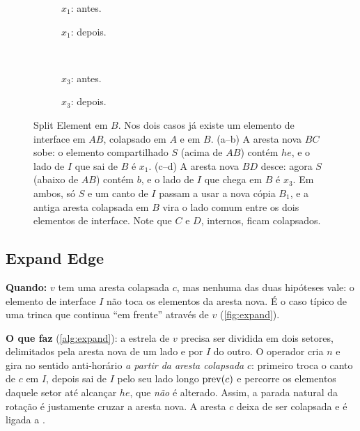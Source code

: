\begin{figure}[ht]
\centering
\begin{subfigure}[b]{0.31\linewidth}\centering\caption{$x_1$: antes.}\end{subfigure}\hspace{0.06\linewidth}
\begin{subfigure}[b]{0.31\linewidth}\centering\caption{$x_1$: depois.}\end{subfigure}\\[6pt]
\begin{subfigure}[b]{0.31\linewidth}\centering\caption{$x_3$: antes.}\end{subfigure}\hspace{0.06\linewidth}
\begin{subfigure}[b]{0.31\linewidth}\centering\caption{$x_3$: depois.}\end{subfigure}
\caption{Split Element em $B$. Nos dois casos já existe um elemento de interface em $AB$, colapsado em $A$ e em $B$.
(a--b) A aresta nova $BC$ sobe: o elemento compartilhado $S$ (acima de $AB$) contém $he$, e o lado de $I$ que sai de $B$
é $x_1$. (c--d) A aresta nova $BD$ desce: agora $S$ (abaixo de $AB$) contém $b$, e o lado de $I$ que chega em $B$ é
$x_3$. Em ambos, só $S$ e um canto de $I$ passam a usar a nova cópia $B_1$, e a antiga aresta colapsada em $B$ vira o
lado comum entre os dois elementos de interface. Note que $C$ e $D$, internos, ficam colapsados.}
\label{fig:split}
\end{figure}

\subsection{Expand Edge}
\label{sec:expand}

\textbf{Quando:} $v$ tem uma aresta colapsada $c$, mas nenhuma das duas hipóteses vale: o elemento de interface $I$ não
toca os elementos da aresta nova. É o caso típico de uma trinca que continua ``em frente'' através de $v$
(\cref{fig:expand}).

\textbf{O que faz} (\cref{alg:expand}): a estrela de $v$ precisa ser dividida em dois setores, delimitados pela aresta
nova de um lado e por $I$ do outro. O operador cria $n$ e gira no sentido anti-horário \emph{a partir da aresta
colapsada} $c$: primeiro troca o canto de $c$ em $I$, depois sai de $I$ pelo seu lado longo $\mathrm{prev}(c)$ e percorre os
elementos daquele setor até alcançar $he$, que \emph{não} é alterado. Assim, a parada natural da rotação é justamente
cruzar a aresta nova. A aresta $c$ deixa de ser colapsada e é ligada a .


